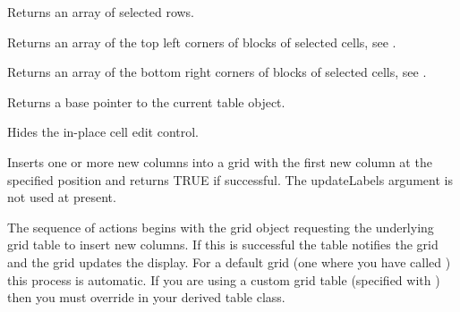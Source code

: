 Returns an array of selected rows.

\label{wxgridgetselectionblocktopleft}


Returns an array of the top left corners of blocks of selected cells, 
see .

\label{wxgridgetselectionblockbottomright}


Returns an array of the bottom right corners of blocks of selected cells,
see .

\label{wxgridgettable}


Returns a base pointer to the current table object.

\label{wxgridhidecelleditcontrol}


Hides the in-place cell edit control.

\label{wxgridinsertcols}


Inserts one or more new columns into a grid with the first new column at the
specified position and returns TRUE if successful. The updateLabels argument is not
used at present. 

The sequence of actions begins with the grid object requesting the underlying grid
table to insert new columns. If this is successful the table notifies the grid and the
grid updates the display. For a default grid (one where you have called 
) this process is automatic. If you are
using a custom grid table (specified with ) 
then you must override 
 in your derived
table class.

\label{wxgridinsertrows}

